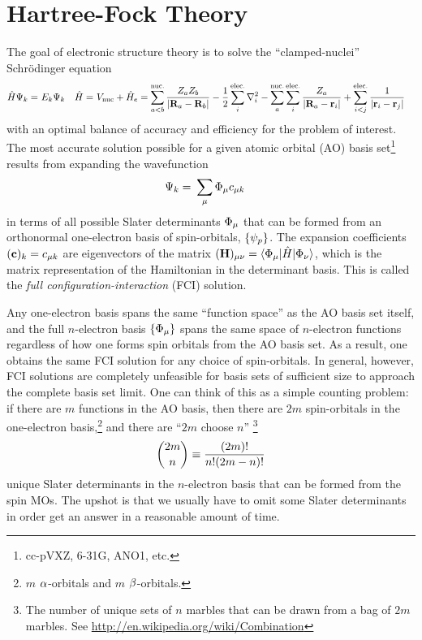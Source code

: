 \documentclass[11pt]{article}
\numberwithin{equation}{section}
\begin{document}
\section{Hartree-Fock Theory}

The goal of electronic structure theory is to solve the ``clamped-nuclei'' Schr\"odinger equation
\begin{align}
\label{eq:electronic-schrodinger-equation}
  \hat{H}\Psi _k
=&\
  E_k\Psi _k
&
  \hat{H}
=&\
  V_{\mathrm{nuc}}
+
  \hat{H}_e
=
  \sum_{a<b}^{\text{nuc.}}
  \frac {Z_aZ_b}{|\mathbf{R}_a-\mathbf{R}_b|}
-
  \frac {1}{2}
  \sum_i^{\text{elec.}}
  \nabla_i^2
-
  \sum_a^{\text{nuc.}}
  \sum_i^{\text{elec.}}
  \frac {Z_a}{|\mathbf{R}_a-\mathbf{r}_i|}
+
  \sum_{i<j}^{\text{elec.}}
  \frac {1}{|\mathbf{r}_i-\mathbf{r}_j|}
\end{align}
with an optimal balance of accuracy and efficiency for the problem of interest.
The most accurate solution possible for a given atomic orbital (AO) basis set\footnote{cc-pVXZ, 6-31G, ANO1, etc.} results from expanding the wavefunction
\begin{align}
\label{eq:full-ci-wavefunction-expansion}
  \Y_k
=&\
  \sum_\mu
  \F_\mu c_{\mu k}
\end{align}
in terms of all possible Slater determinants $\F_\mu$ that can be formed from an orthonormal one-electron basis of spin-orbitals, $\{\psi _p\}$.
The expansion coefficients $(\bo{c})_k=c_{\mu k}$ are eigenvectors of the matrix $(\bo{H})_{\mu\nu}=\ip{\F_\mu|\op{H}|\F_\nu}$, which is the matrix representation of the Hamiltonian in the determinant basis.
This is called the {\it full configuration-interaction} (FCI) solution.

Any one-electron basis spans the same ``function space'' as the AO basis set itself, and the full $n$-electron basis $\{\F_\mu\}$ spans the same space of $n$-electron functions regardless of how one forms spin orbitals from the AO basis set.
As a result, one obtains the same FCI solution for any choice of spin-orbitals.
In general, however, FCI solutions are completely unfeasible for basis sets of sufficient size to approach the complete basis set limit.
One can think of this as a simple counting problem: if there are $m$ functions in the AO basis, then there are $2m$ spin-orbitals in the one-electron basis,\footnote{$m$ $\alpha $-orbitals and $m$ $\beta $-orbitals.} and there are ``$2m$ choose $n$'' \footnote{The number of unique sets of $n$ marbles that can be drawn from a bag of $2m$ marbles.  See \url{http://en.wikipedia.org/wiki/Combination}}
\begin{align*}
{2m \choose n}\equiv\frac {(2m)!}{n!(2m-n)!}
\end{align*}
unique Slater determinants in the $n$-electron basis that can be formed from the spin MOs.
The upshot is that we usually have to omit some Slater determinants in order get an answer in a reasonable amount of time.
\end{document}
